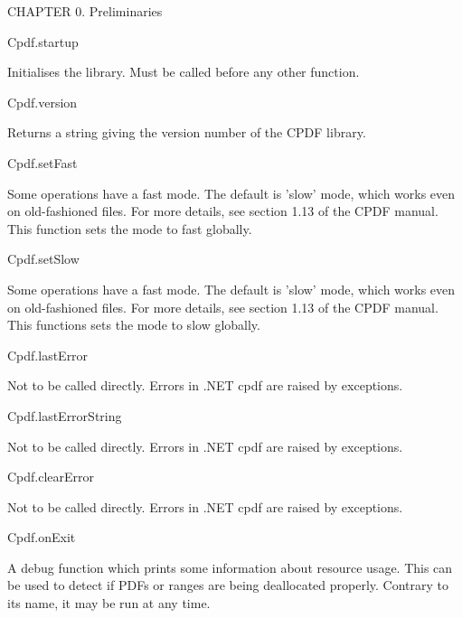 CHAPTER 0. Preliminaries

Cpdf.startup

Initialises the library. Must be called before any other function.

Cpdf.version

Returns a string giving the version number of the CPDF library.

Cpdf.setFast

Some operations have a fast mode. The default is 'slow' mode, which works even
on old-fashioned files. For more details, see section 1.13 of the CPDF manual.
This function sets the mode to fast globally.

Cpdf.setSlow

Some operations have a fast mode. The default is 'slow' mode, which works even
on old-fashioned files. For more details, see section 1.13 of the CPDF manual.
This functions sets the mode to slow globally.

Cpdf.lastError

Not to be called directly. Errors in .NET cpdf are raised by exceptions.

Cpdf.lastErrorString

Not to be called directly. Errors in .NET cpdf are raised by exceptions.

Cpdf.clearError

Not to be called directly. Errors in .NET cpdf are raised by exceptions.

Cpdf.onExit

A debug function which prints some information about resource usage. This can
be used to detect if PDFs or ranges are being deallocated properly. Contrary to
its name, it may be run at any time.
